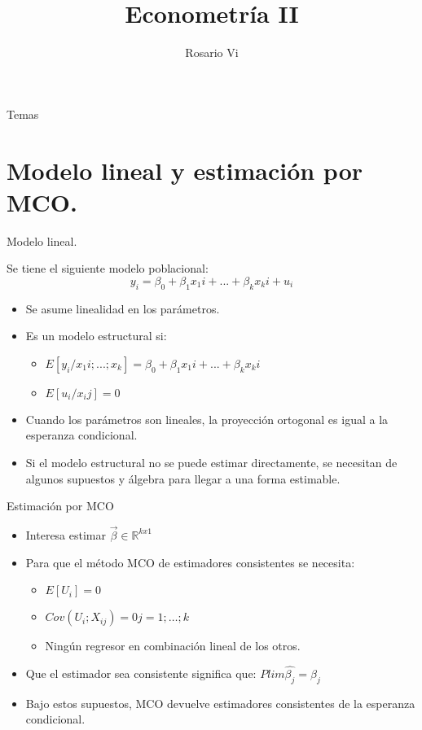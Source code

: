 \documentclass{beamer}
\title{Econometr\'ia II}
\author{Rosario Vi}
\institute{Facultad de Ciencias Econ\'omicas, UBA.}
\date{ }
\begin{document}
\begin{frame}
  \titlepage
\end{frame}


\begin{frame}{Temas}
  \tableofcontents
\end{frame}

\section{Modelo lineal y estimaci\'on por MCO.}

\begin{frame}{Modelo lineal.}

Se tiene el siguiente modelo poblacional:
\begin{equation}
    y_i = \beta_0 + \beta_1 x_1i  +...+ \beta_k x_ki + u_i
\end{equation}

\begin{itemize}
  \item Se asume linealidad en los par\'ametros.
  \item Es un modelo estructural si:
  \begin{itemize}
      \item $ E[y_i/x_1i;...;x_k]=\beta_0 + \beta_1x_1i+...+\beta_k x_ki $
      \item $E[u_i/x_ij]=0$
 \end{itemize}
 \item Cuando los parámetros son lineales, la proyecci\'on ortogonal es igual a la esperanza condicional.
 \item Si el modelo estructural no se puede estimar directamente, se necesitan de algunos supuestos y \'algebra para llegar a una forma estimable.
\end{itemize}

\end{frame}

\begin{frame}{Estimaci\'on por MCO}
\begin{itemize}
    \item Interesa estimar $ \Vec{\beta} \in \mathbb{R}^{kx1}$
    \item Para que el método MCO de estimadores consistentes se necesita:
    \begin{itemize}
        \item $E[U_i]=0$
        \item $Cov(U_i ; X_{ij})=0  j=1;\dotsc;k$
        \item Ningún regresor en combinaci\'on lineal de los otros.
    \end{itemize}
   \item Que el estimador sea consistente significa que:
   $Plim \hat{\beta_j}=\beta_j$
   \item Bajo estos supuestos, MCO devuelve estimadores consistentes de la esperanza condicional.
\end{itemize}

\end{frame}
\end{document}
